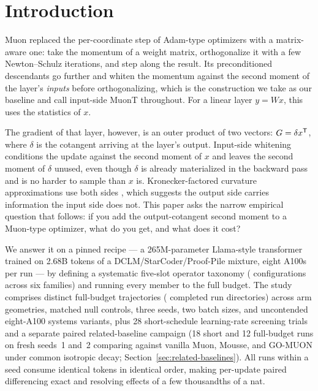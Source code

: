 \section{Introduction}
\label{sec:intro}

Muon \citep{jordan2024muon} replaced the per-coordinate step of Adam-type
optimizers with a matrix-aware one: take the momentum of a weight matrix,
orthogonalize it with a few Newton--Schulz iterations, and step along the
result. Its preconditioned descendants go further and whiten the momentum
against the second moment of the layer's \emph{inputs} before orthogonalizing,
which is the construction we take as our baseline and call input-side MuonT
throughout. For a linear layer $y=Wx$, this uses the statistics of $x$.

The gradient of that layer, however, is an outer product of two vectors:
$G=\delta x^{{\mathsf T}}$, where $\delta$ is the cotangent arriving at the layer's
output. Input-side whitening conditions the update against the second moment
of $x$ and leaves the second moment of $\delta$ unused, even though $\delta$ is
already materialized in the backward pass and is no harder to sample than $x$
is. Kronecker-factored curvature approximations use both sides
\citep{martens2015kfac,gupta2018shampoo}, which suggests the output side
carries information the input side does not. This paper asks the narrow
empirical question that follows: if you add the output-cotangent second moment
to a Muon-type optimizer, what do you get, and what does it cost?

We answer it on a pinned recipe --- a 265M-parameter Llama-style transformer
trained on 2.68B tokens of a DCLM/StarCoder/Proof-Pile mixture, eight A100s per
run --- by defining a systematic five-slot operator taxonomy (\nOptimizerArms{}
configurations across six families) and running every member to the full budget.
The study comprises \nDistinctRuns{} distinct full-budget trajectories
(\nRunDirs{} completed run directories) across arm geometries, matched null
controls, three seeds, two batch sizes, and uncontended eight-A100 systems
variants, plus 28 short-schedule learning-rate screening trials and a separate
paired related-baseline campaign (18 short and 12 full-budget runs on fresh
seeds~1 and~2 comparing  against vanilla Muon, Mousse, and
GO-MUON under common isotropic decay; Section~\ref{sec:related-baselines}). All runs within
a seed consume identical tokens in identical order, making per-update paired
differencing exact and resolving effects of a few thousandths of a nat.

